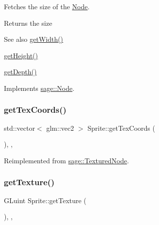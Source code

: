 Fetches the size of the \mbox{\hyperlink{classsage_1_1Node}{Node}}. 

\begin{DoxyReturn}{Returns}
the size 
\end{DoxyReturn}
\begin{DoxySeeAlso}{See also}
\mbox{\hyperlink{classsage_1_1Node_a65163ffabcfe9f482282ea37ead6fc5f}{get\+Width()}} 

\mbox{\hyperlink{classsage_1_1Node_a6af5a8378ac8d2c3490adbc2a03f1247}{get\+Height()}} 

\mbox{\hyperlink{classsage_1_1Node_a5c4c28939c7adf7e4a65dbb02c0cbcd3}{get\+Depth()}} 
\end{DoxySeeAlso}


Implements \mbox{\hyperlink{classsage_1_1Node_ad14a04d08b5261c27d3080f6a5e12836}{sage\+::\+Node}}.

\mbox{\label{classsage_1_1Sprite_a3e5acc98484d2f326fdd1ff622cfd2ff}} 
\subsubsection{\texorpdfstring{getTexCoords()}{getTexCoords()}}
{\footnotesize\ttfamily std\+::vector$<$ glm\+::vec2 $>$ Sprite\+::get\+Tex\+Coords (\begin{DoxyParamCaption}{ }\end{DoxyParamCaption})\hspace{0.3cm}{\ttfamily [override]}, {\ttfamily [protected]}, {\ttfamily [virtual]}}



Reimplemented from \mbox{\hyperlink{classsage_1_1TexturedNode_ada858d240f8074fd97e8a72e74d18a30}{sage\+::\+Textured\+Node}}.

\mbox{\label{classsage_1_1Sprite_aa75f3595b809f99847a9642ce2bf319a}} 
\subsubsection{\texorpdfstring{getTexture()}{getTexture()}}
{\footnotesize\ttfamily G\+Luint Sprite\+::get\+Texture (\begin{DoxyParamCaption}{ }\end{DoxyParamCaption})\hspace{0.3cm}{\ttfamily [override]}, {\ttfamily [protected]}, {\ttfamily [virtual]}}



